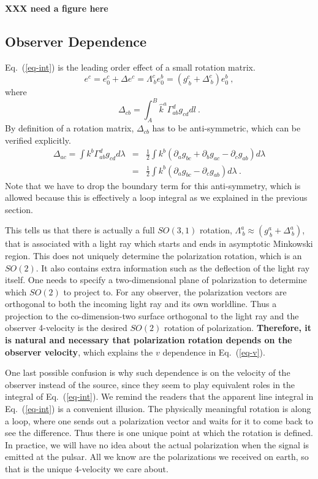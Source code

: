 \documentclass[aps,showpacs,onecolumn,floats,prd,superscriptaddress,nofootinbib]{revtex4}
\begin{document}
{\bf XXX need a figure here}

\subsection{Observer Dependence}

Eq.~(\ref{eq-int}) is the leading order effect of a small rotation matrix.
\begin{equation}
e^c = e_0^c + \Delta e^c = \Lambda^c_{\ b} e_0^b = 
\left( g^c_{\ b} + \Delta^c_{\ b} \right) e_0^b~,
\end{equation}
where
\begin{equation}
\Delta_{cb} = \int_A^B \hat{k}^a \Gamma^d_{ab} g_{cd}dl~.
\end{equation}
By definition of a rotation matrix, $\Delta_{cb}$ has to be anti-symmetric, which can be verified explicitly.
\begin{eqnarray}
\Delta_{ac} = \int k^b\Gamma_{ab}^d g_{cd}d\lambda &=& 
\frac{1}{2} \int k^b \left(\partial_a g_{bc} + \partial_bg_{ac} - \partial_c g_{ab}\right)d\lambda
\label{eq-Delta}
\\ \nonumber
&=& \frac{1}{2} \int k^b \left(\partial_a g_{bc} - \partial_c g_{ab}\right)d\lambda~.
\end{eqnarray}
Note that we have to drop the boundary term for this anti-symmetry, which is allowed because this is effectively a loop integral as we explained in the previous section.

This tells us that there is actually a full $SO(3,1)$ rotation, $\Lambda^a_{\ b}\approx\left(g^a_{\ b} + \Delta^a_{\ b}\right)$, that is associated with a light ray which starts and ends in asymptotic Minkowski region. 
This does not uniquely determine the polarization rotation, which is an $SO(2)$. 
It also contains extra information such as the deflection of the light ray itself. 
One needs to specify a two-dimensional plane of polarization to determine which $SO(2)$ to project to. 
For any observer, the polarization vectors are orthogonal to both the incoming light ray and its own worldline. 
Thus a projection to the co-dimension-two surface orthogonal to the light ray and the observer 4-velocity is the desired $SO(2)$ rotation of polarization. 
{\bf Therefore, it is natural and necessary that polarization rotation depends on the observer velocity}, which explains the $v$ dependence in Eq.~(\ref{eq-v}).

One last possible confusion is why such dependence is on the velocity of the observer instead of the source, since they seem to play equivalent roles in the integral of Eq.~(\ref{eq-int}). 
We remind the readers that the apparent line integral in Eq.~(\ref{eq-int}) is a convenient illusion. 
The physically meaningful rotation is along a loop, where one sends out a polarization vector and waits for it to come back to see the difference. 
Thus there is one unique point at which the rotation is defined. 
In practice, we will have no idea about the actual polarization when the signal is emitted at the pulsar. 
All we know are the polarizations we received on earth, so that is the unique 4-velocity we care about.
\end{document}
